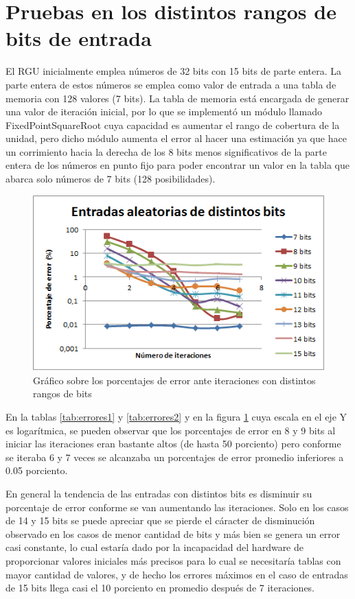 \section{Pruebas en los distintos rangos de bits de entrada}

El  RGU inicialmente emplea números de 32 bits con 15 bits de parte entera. La parte entera de estos números se emplea como valor de entrada a una tabla de memoria con 128 valores (7 bits). La tabla de memoria está encargada de generar una valor de iteración inicial, por lo que se implementó un módulo llamado FixedPointSquareRoot cuya capacidad es aumentar el rango de cobertura de la unidad, pero dicho módulo aumenta el error al hacer una estimación ya que hace un corrimiento hacia la derecha de los 8 bits menos significativos de la parte entera de los números en punto fijo para poder encontrar un valor en la tabla que abarca solo números de 7 bits (128 posibilidades).

\begin{figure}
	\includegraphics[width=0.7\linewidth]{images/puntos}
	\caption{Gráfico sobre los porcentajes de error ante iteraciones con distintos rangos de bits} \label{fig:puntos}
\end{figure}
En la tablas \ref{tab:errores1} y \ref{tab:errores2} y en la figura \ref{fig:puntos} cuya escala en el eje Y es logarítmica, se pueden observar que los porcentajes de error en 8 y 9 bits al iniciar las iteraciones eran bastante altos (de hasta 50 porciento) pero conforme se iteraba 6 y 7 veces se alcanzaba un porcentajes de error promedio inferiores a 0.05 porciento. 

En general la tendencia de las entradas con distintos bits es disminuir su porcentaje de error conforme se van aumentando las iteraciones. Solo en los casos de 14 y 15 bits se puede apreciar que se pierde el cáracter de disminución observado en los casos de menor cantidad de bits y más bien se genera un error casi constante, lo cual estaría dado por la incapacidad del hardware de proporcionar valores iniciales más precisos para lo cual se necesitaría tablas con mayor cantidad de valores, y de hecho los errores máximos en el caso de entradas de 15 bits llega casi el 10 porciento en promedio después de 7 iteraciones.
 
